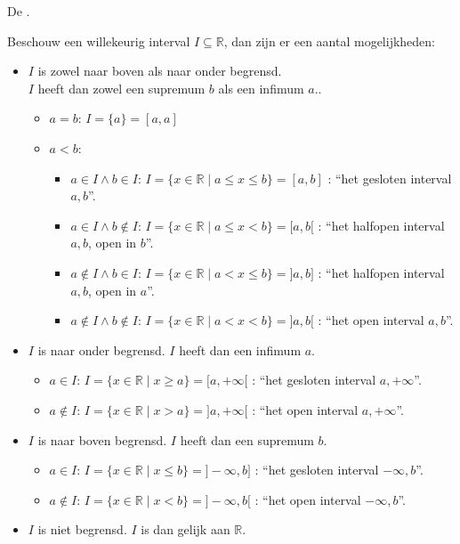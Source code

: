 \documentclass[main.tex]{subfiles}
\begin{document}
\begin{st}
  De .

  Beschouw een willekeurig interval $I \subseteq \mathbb{R}$, dan zijn er een aantal mogelijkheden:
  \begin{itemize}
  \item $I$ is zowel naar boven als naar onder begrensd.\\
    $I$ heeft dan zowel een supremum $b$ als een infimum $a$..
    \begin{itemize}
    \item $a=b$: $I=\{a\} = [a,a]$
    \item $a<b$: 
      \begin{itemize}
      \item $a\in I \wedge b\in I$: $I = \{ x\in \mathbb{R} \mid a\le x \le b\} = [a,b]$ : ``het gesloten interval $a,b$''.
      \item $a\in I \wedge b\not\in I$: $I = \{ x\in \mathbb{R} \mid a\le x < b\} = [a,b[$ : ``het halfopen interval $a,b$, open in $b$''.
      \item $a\not\in I \wedge b\in I$: $I = \{ x\in \mathbb{R} \mid a< x \le b\} = ]a,b]$ : ``het halfopen interval $a,b$, open in $a$''.
      \item $a\not\in I \wedge b\not\in I$: $I = \{ x\in \mathbb{R} \mid a< x < b\} = ]a,b[$ : ``het open interval $a,b$''.
      \end{itemize}
    \end{itemize}
  \item $I$ is naar onder begrensd.
    $I$ heeft dan een infimum $a$.
    \begin{itemize}
    \item $a\in I$: $I = \{ x\in \mathbb{R} \mid x \ge a\} = [a,+\infty[$ : ``het gesloten interval $a, +\infty$''.
    \item $a\not\in I$: $I = \{ x\in \mathbb{R} \mid x > a\} = ]a,+\infty[$ : ``het open interval $a, +\infty$''.
    \end{itemize}
  \item $I$ is naar boven begrensd.
    $I$ heeft dan een supremum $b$.
    \begin{itemize}
    \item $a\in I$: $I = \{ x\in \mathbb{R} \mid x \le b \} = ]-\infty,b]$ : ``het gesloten interval $-\infty, b$''.
    \item $a\not\in I$: $I = \{ x\in \mathbb{R} \mid x < b \} = ]-\infty,b[$ : ``het open interval $-\infty,b$''. 
    \end{itemize}
  \item $I$ is niet begrensd. $I$ is dan gelijk aan $\mathbb{R}$.
  \end{itemize}
  \zb
\end{st}
\end{document}
